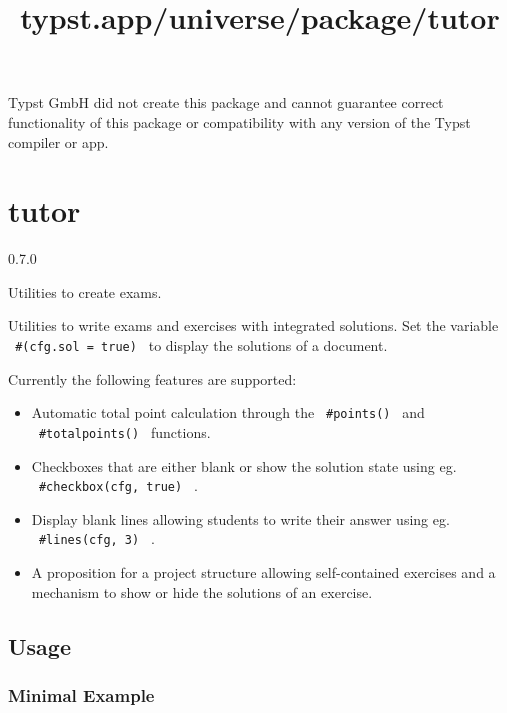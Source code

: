 Typst GmbH did not create this package and cannot guarantee correct
functionality of this package or compatibility with any version of the
Typst compiler or app.


\title{typst.app/universe/package/tutor}

\label{banner}
\section{tutor}\label{tutor}

{ 0.7.0 }

Utilities to create exams.

\label{readme}
Utilities to write exams and exercises with integrated solutions. Set
the variable \texttt{\ \#(cfg.sol\ =\ true)\ } to display the solutions
of a document.

Currently the following features are supported:

\begin{itemize}
\tightlist
\item
  Automatic total point calculation through the \texttt{\ \#points()\ }
  and \texttt{\ \#totalpoints()\ } functions.
\item
  Checkboxes that are either blank or show the solution state using eg.
  \texttt{\ \#checkbox(cfg,\ true)\ } .
\item
  Display blank lines allowing students to write their answer using eg.
  \texttt{\ \#lines(cfg,\ 3)\ } .
\item
  A proposition for a project structure allowing self-contained
  exercises and a mechanism to show or hide the solutions of an
  exercise.
\end{itemize}

\subsection{Usage}\label{usage}

\subsubsection{Minimal Example}\label{minimal-example}

\begin{Shaded}
\begin{Highlighting}[]



\end{Highlighting}
\end{Shaded}

